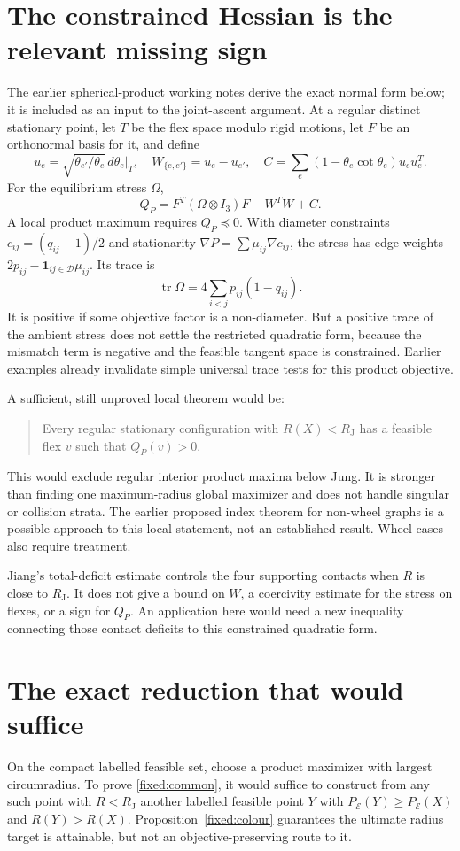 \documentclass[11pt]{article}
\theoremstyle{remark}\newtheorem{remark}[theorem]{Remark}
\newcommand{\RJ}{R_{\mathrm J}}
\begin{document}
\section{The constrained Hessian is the relevant missing sign}
The earlier spherical-product working notes \cite{Local} derive the exact normal form below; it is included as an input to the joint-ascent argument.
At a regular distinct stationary point, let $T$ be the flex space modulo
rigid motions, let $F$ be an orthonormal basis for it, and define
\[
 u_e=\sqrt{\theta_{e'}/\theta_e}\,d\theta_e|_T,
 \quad W_{\{e,e'\}}=u_e-u_{e'},\quad
 C=\sum_e(1-\theta_e\cot\theta_e)u_eu_e^T.
\]
For the equilibrium stress $\Omega$,
\[
 Q_P=F^T(\Omega\otimes I_3)F-W^TW+C.
\]
A local product maximum requires $Q_P\preceq0$.
With diameter constraints $c_{ij}=(q_{ij}-1)/2$ and stationarity
$\nabla P=\sum\mu_{ij}\nabla c_{ij}$, the stress has edge weights
$2p_{ij}-\mathbf1_{ij\in\mathcal D}\mu_{ij}$. Its trace is
\[
 \operatorname{tr}\Omega=4\sum_{i<j}p_{ij}(1-q_{ij}).
\]
It is positive if some objective factor is a non-diameter. But a positive
trace of the ambient stress does not settle the restricted quadratic
form, because the mismatch term is negative and the feasible tangent
space is constrained. Earlier examples already invalidate simple
universal trace tests for this product objective.

A sufficient, still unproved local theorem would be:
\begin{quote}
Every regular stationary configuration with $R(X)<\RJ$ has a feasible
flex $v$ such that $Q_P(v)>0$.
\end{quote}
This would exclude regular interior product maxima below Jung. It is
stronger than finding one maximum-radius global maximizer and does not
handle singular or collision strata. The earlier proposed index theorem
for non-wheel graphs is a possible approach to this local statement,
not an established result. Wheel cases also require treatment.

Jiang's total-deficit estimate controls the four supporting contacts
when $R$ is close to $\RJ$. It does not give a bound on $W$, a
coercivity estimate for the stress on flexes, or a sign for $Q_P$.
An application here would need a new inequality connecting those
contact deficits to this constrained quadratic form.

\section{The exact reduction that would suffice}
On the compact labelled feasible set, choose a product maximizer with
largest circumradius. To prove \eqref{fixed:common}, it would suffice to
construct from any such point with $R<\RJ$ another labelled feasible
point $Y$ with $P_{\mathcal E}(Y)\geq P_{\mathcal E}(X)$ and
$R(Y)>R(X)$. Proposition~\ref{fixed:colour} guarantees the ultimate radius
target is attainable, but not an objective-preserving route to it.
\end{document}
